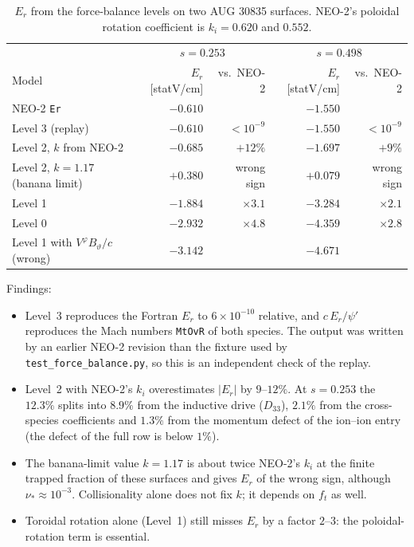 \documentclass[11pt]{article}
\newcommand{\tht}{\vartheta}
\newcommand{\ph}{\varphi}
\newcommand{\code}[1]{\texttt{#1}}
\begin{document}
\begin{table}[h]
\centering
\begin{tabular}{lrrrr}
  \toprule
  & \multicolumn{2}{c}{$s = 0.253$} & \multicolumn{2}{c}{$s = 0.498$} \\
  Model & $E_r$ [statV/cm] & vs.\ NEO-2 & $E_r$ [statV/cm] & vs.\ NEO-2 \\
  \midrule
  NEO-2 \code{Er}                         & $-0.610$ & & $-1.550$ & \\
  Level 3 (replay)                        & $-0.610$ & $<10^{-9}$ & $-1.550$ & $<10^{-9}$ \\
  Level 2, $k$ from NEO-2                 & $-0.685$ & $+12\%$ & $-1.697$ & $+9\%$ \\
  Level 2, $k = 1.17$ (banana limit)      & $+0.380$ & wrong sign & $+0.079$ & wrong sign \\
  Level 1                                 & $-1.884$ & $\times 3.1$ & $-3.284$ & $\times 2.1$ \\
  Level 0                                 & $-2.932$ & $\times 4.8$ & $-4.359$ & $\times 2.8$ \\
  \midrule
  Level 1 with $V^\ph B_\tht/c$ (wrong)   & $-3.142$ & & $-4.671$ & \\
  \bottomrule
\end{tabular}
\caption{$E_r$ from the force-balance levels on two AUG 30835 surfaces.
NEO-2's poloidal rotation coefficient is $k_i = 0.620$ and $0.552$.}
\label{tab:levels}
\end{table}

Findings:
\begin{itemize}
  \item Level~3 reproduces the Fortran $E_r$ to $6\times10^{-10}$ relative,
    and $c\,E_r/\psi'$ reproduces the Mach numbers \code{MtOvR} of both
    species.  The output was written by an earlier NEO-2 revision than the
    fixture used by \code{test\_force\_balance.py}, so this is an independent
    check of the replay.
  \item Level~2 with NEO-2's $k_i$ overestimates $|E_r|$ by $9$--$12\%$.  At
    $s = 0.253$ the $12.3\%$ splits into $8.9\%$ from the inductive drive
    ($D_{33}$), $2.1\%$ from the cross-species coefficients and $1.3\%$ from
    the momentum defect of the ion--ion entry (the defect of the full row is
    below $1\%$).
  \item The banana-limit value $k = 1.17$ is about twice NEO-2's $k_i$ at the
    finite trapped fraction of these surfaces and gives $E_r$ of the wrong
    sign, although $\nu_* \approx 10^{-3}$.  Collisionality alone does not
    fix $k$; it depends on $f_t$ as well.
  \item Toroidal rotation alone (Level~1) still misses $E_r$ by a factor
    $2$--$3$: the poloidal-rotation term is essential.
\end{itemize}
\end{document}
